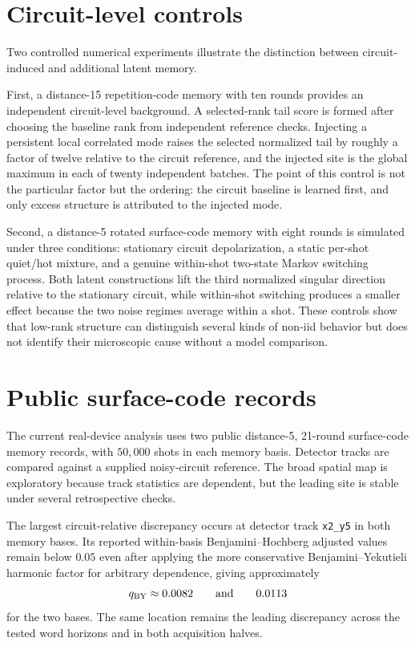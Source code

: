 \documentclass[11pt]{article}
\begin{document}
\section{Circuit-level controls}
Two controlled numerical experiments illustrate the distinction between circuit-induced and additional latent memory.

First, a distance-15 repetition-code memory with ten rounds provides an independent circuit-level background. A selected-rank tail score is formed after choosing the baseline rank from independent reference checks. Injecting a persistent local correlated mode raises the selected normalized tail by roughly a factor of twelve relative to the circuit reference, and the injected site is the global maximum in each of twenty independent batches. The point of this control is not the particular factor but the ordering: the circuit baseline is learned first, and only excess structure is attributed to the injected mode.

Second, a distance-5 rotated surface-code memory with eight rounds is simulated under three conditions: stationary circuit depolarization, a static per-shot quiet/hot mixture, and a genuine within-shot two-state Markov switching process. Both latent constructions lift the third normalized singular direction relative to the stationary circuit, while within-shot switching produces a smaller effect because the two noise regimes average within a shot. These controls show that low-rank structure can distinguish several kinds of non-iid behavior but does not identify their microscopic cause without a model comparison.

\section{Public surface-code records}
The current real-device analysis uses two public distance-5, 21-round surface-code memory records, with $50{,}000$ shots in each memory basis. Detector tracks are compared against a supplied noisy-circuit reference. The broad spatial map is exploratory because track statistics are dependent, but the leading site is stable under several retrospective checks.

The largest circuit-relative discrepancy occurs at detector track \texttt{x2\_y5} in both memory bases. Its reported within-basis Benjamini--Hochberg adjusted values remain below $0.05$ even after applying the more conservative Benjamini--Yekutieli harmonic factor for arbitrary dependence, giving approximately
\[
q_{\rm BY}\approx0.0082\qquad\text{and}\qquad0.0113
\]
for the two bases. The same location remains the leading discrepancy across the tested word horizons and in both acquisition halves.
\end{document}
